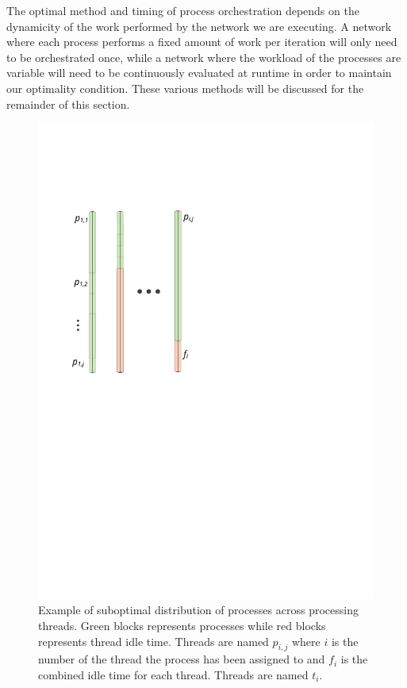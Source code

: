 The optimal method and timing of process orchestration depends on the
dynamicity  of the work
performed by the network we are executing. A network where each
process performs a fixed amount of work per iteration will only need
to be orchestrated once, while a network where the workload of the
processes are variable will need to be continuously evaluated at
runtime in order to maintain our optimality condition. These various
methods will be discussed for the remainder of this section.


\begin{figure}
\centering
\includegraphics{figures/parallel}
\caption[Proposed SME parallelization model]{Example of suboptimal
  distribution of processes across processing threads. Green blocks
  represents processes while red blocks represents thread idle
  time. Threads are named $p_{i,j}$ where $i$ is the number of the
  thread the process has been assigned to and $f_i$ is the combined
  idle time for each thread. Threads are named $t_i$.}

\label{fig:suboptdist}

\end{figure}




